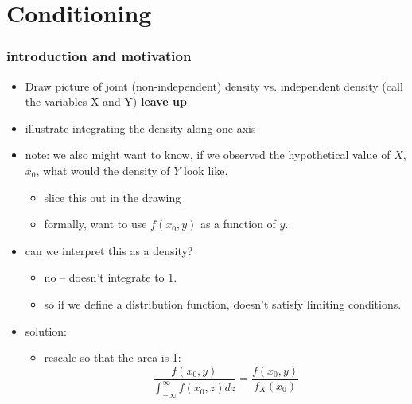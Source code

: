 

\part*{Conditioning}%

\section{introduction and motivation}

\begin{itemize}
\item Draw picture of joint (non-independent) density vs. independent
      density (call the variables X and Y) \textbf{leave up}
\item illustrate integrating the density along one axis
\item note: we also might want to know, if we observed the hypothetical
      value of $X$, $x_0$, what would the density of $Y$ look like.
\begin{itemize}
\item slice this out in the drawing
\item formally, want to use $f(x_0, y)$ as a function of $y$.
\end{itemize}
\item can we interpret this as a density?
\begin{itemize}
\item no -- doesn't integrate to 1.
\item so if we define a distribution function, doesn't satisfy
        limiting conditions.
\end{itemize}
\item solution:
\begin{itemize}
\item rescale so that the area is 1:
        \[ \frac{f(x_0, y)}{\int_{-\infty}^{\infty} f(x_0, z) dz} =
        \frac{f(x_0, y)}{f_X(x_0)}\]
\end{itemize}
\end{itemize}

